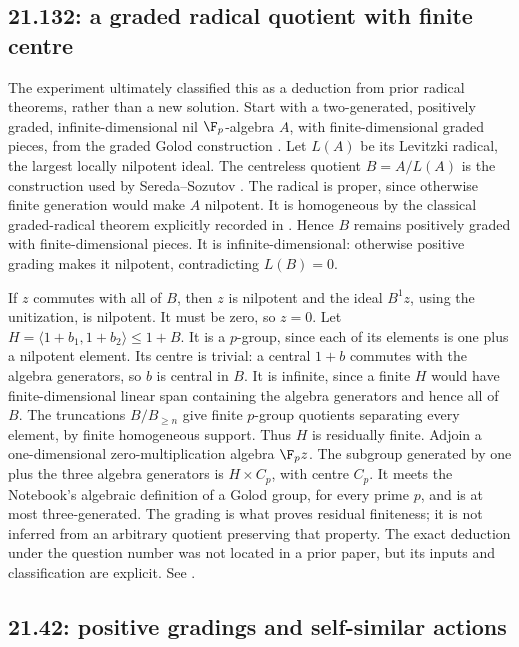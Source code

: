 \subsection{21.132: a graded radical quotient with finite centre}
\label{prior:21.132}

The experiment ultimately classified this as a deduction from
prior radical theorems, rather than a new solution.
Start with a two-generated, positively graded, infinite-dimensional
nil \(\F_p\)-algebra \(A\), with finite-dimensional graded pieces,
from the graded Golod construction \cite{ershov-gs}.
Let \(L(A)\) be its Levitzki radical, the largest locally
nilpotent ideal. The centreless quotient \(B=A/L(A)\) is
the construction used by Sereda--Sozutov \cite{sereda-sozutov}.
The radical is proper, since otherwise finite generation
would make \(A\) nilpotent. It is homogeneous by the classical
graded-radical theorem explicitly recorded in
\cite{hong-nilradicals}. Hence \(B\) remains positively graded
with finite-dimensional pieces. It is infinite-dimensional:
otherwise positive grading makes it nilpotent, contradicting
\(L(B)=0\).

If \(z\) commutes with all of \(B\), then \(z\) is nilpotent
and the ideal \(B^1z\), using the unitization, is nilpotent.
It must be zero, so \(z=0\).
Let \(H=\langle1+b_1,1+b_2\rangle\le1+B\).
It is a \(p\)-group, since each of its elements is one plus
a nilpotent element. Its centre is trivial: a central
\(1+b\) commutes with the algebra generators, so \(b\) is
central in \(B\). It is infinite, since a finite \(H\) would
have finite-dimensional linear span containing the algebra
generators and hence all of \(B\).
The truncations \(B/B_{\ge n}\) give finite \(p\)-group
quotients separating every element, by finite homogeneous
support. Thus \(H\) is residually finite.
Adjoin a one-dimensional zero-multiplication algebra
\(\F_pz\). The subgroup generated by one plus the three
algebra generators is \(H\times C_p\), with centre \(C_p\).
It meets the Notebook's algebraic definition of a Golod
group, for every prime \(p\), and is at most three-generated.
The grading is what proves residual finiteness; it is not
inferred from an arbitrary quotient preserving that property.
The exact deduction under the question number was not located
in a prior paper, but its inputs and classification are explicit.
See .

\subsection{21.42: positive gradings and self-similar actions}
\label{prior:21.42}


